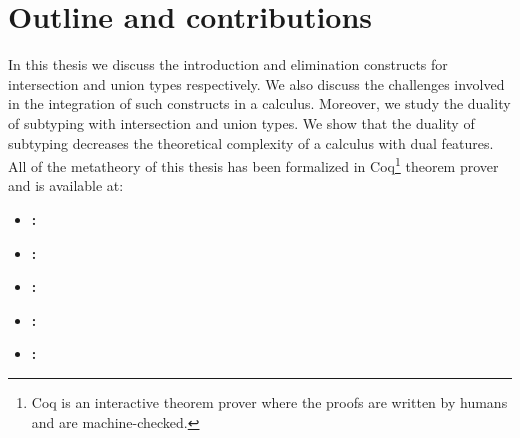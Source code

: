 \section{Outline and contributions}
In this thesis we discuss the introduction and elimination
constructs for intersection and union types respectively.
We also discuss the challenges involved in the integration of
such constructs in a calculus.
Moreover, we study the duality of subtyping
with intersection and union types.
We show that the duality of subtyping decreases the
theoretical complexity of a calculus with dual features.
All of the metatheory of this thesis has been formalized 
in Coq\footnote{Coq is an interactive theorem prover where
the proofs are written by humans
and are machine-checked.}
theorem prover and is available at:

\begin{itemize}
  \item \textbf{:} \href{https://github.com/baberrehman/disjoint-switches}{\color{blue}{https://github.com/baberrehman/disjoint-switches}}

  \item \textbf{:} \href{https://github.com/baberrehman/phd-thesis-artifact/tree/main/chap4}{\color{blue}{https://github.com/baberrehman/phd-thesis-artifact/tree/main/artifact/chap4}}

  \item \textbf{:} \href{https://github.com/baberrehman/phd-thesis-artifact/tree/main/chap5}{\color{blue}{https://github.com/baberrehman/phd-thesis-artifact/tree/main/artifact/chap5}}

  \item \textbf{:} \href{https://github.com/baberrehman/coq-duotyping}{\color{blue}{https://github.com/baberrehman/coq-duotyping}}

  \item \textbf{:} \href{https://github.com/baberrehman/phd-thesis-artifact/tree/main/appendixA}{\color{blue}{https://github.com/baberrehman/phd-thesis-artifact/tree/main/artifact/appendixA}}
\end{itemize}

